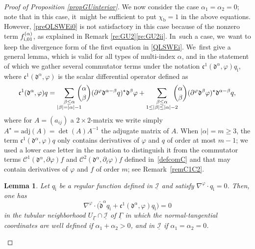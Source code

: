 \documentclass[JEP,XML,SOM,Unicode,NoFloatCountersInSection,published]{cedram}
\newcommand{\cI}{{\mathcal I}}
\newcommand{\ul}[1]{\underline{#1}}
\newcommand{\itGamma}{\mathit{\Gamma}}
\newcommand{\cmfalpha}{\check{\mathfrak{d}}^{\alpha}}
\newtheorem{lemma}[theorem]{Lemma}
\theoremstyle{definition}
\begin{document}
\begin{proof}[Proof of Proposition \ref{propGUinterior}]
We now consider the case $\alpha_1=\alpha_2=0$; note that in this case, it~might be sufficient to put $\chi_\mathrm{b}=1$ in the above equations.
However, \eqref{preQLSWEi0} is not satisfactory in this case because of the nonzero term $f_{{\rm i},01}^{(\alpha)}$, as explained in Remark \ref{re:GU2}\eqref{re:GU2ii}. In~such a case, we~want to keep the divergence form of the first equation in \eqref{QLSWEi}. We~first give a general lemma, which is valid for all types of multi-index $\alpha$,
and in the statement of which we gather several commutator terms under the notation ${\mathfrak c}^1({\mathfrak d}^\alpha,\varphi)q_\mathrm{i}$,
where ${\mathfrak c}^1({\mathfrak d}^\alpha,\varphi)$ is the scalar differential operator defined as
\begin{equation}
\mathfrak{c}^1({\mathfrak d}^\alpha,\varphi) q
= \sum_{\substack{\beta\leq\alpha\\ |\beta|=|\alpha|-1}}\hspace*{-3mm}\binom{\alpha}{\beta} (\partial^\varphi\mathfrak{d}^{\alpha-\beta} q)^\star \mathfrak{d}^{\beta}\varphi
+ \sum_{\substack{\beta\leq\alpha\\ 1 \leq |\beta| \leq |\alpha|-2}} \hspace*{-3mm}\binom{\alpha}{\beta}
(\partial^\varphi\mathfrak{d}^{\beta}\varphi)^\star \mathfrak{d}^{\alpha-\beta} q,
\end{equation}
where for $A=(a_{ij})$ a $2\times2$-matrix we write simply $A^\star=\mbox{adj}(A)=\det(A)A^{-1}$ the adjugate matrix of $A$.
When $\vert \alpha\vert=m\geq 3$,
the term $\mathfrak{c}^1({\mathfrak d}^\alpha,\varphi) q$ only contains derivatives of $\varphi$ and $q$ of order at most $m-1$;
we used a lower case letter in the notation to distinguish it from the commutator terms ${\mathcal C}^1(\mathfrak{d}^\alpha,\partial \varphi)f$ and
${\mathcal C}^2(\mathfrak{d}^\alpha,\partial_t \varphi)f$ defined in~\eqref{defcomC} and that may contain derivatives of $\varphi$ and $f$ of order $m$;
see Remark~\ref{remC1C2}.

\begin{lemma}
Let $q_\mathrm{i}$ be a regular function defined in $\ul{\cI}$ and satisfy $\nabla^\varphi\cdot q_\mathrm{i}=0$.
Then, one has
\[
\nabla^\varphi\cdot\big(\cmfalpha q_\mathrm{i} + \mathfrak{c}^1({\mathfrak d}^\alpha,\varphi) q_\mathrm{i} \big) = 0
\]
in the tubular neighborhood $U_{\ul{\itGamma}}\cap \ul{\cI}$ of $\underline{\itGamma}$
in which the normal-tangential coordinates are well defined if $\alpha_1+\alpha_2>0$, and in $\ul{\cI}$ if $\alpha_1=\alpha_2=0$.
\end{lemma}


\end{proof}
\end{document}
